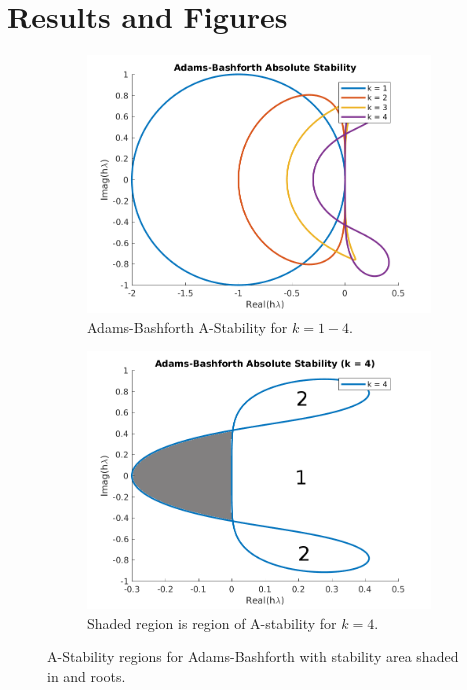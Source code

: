 \documentclass[12pt]{article}
\theoremstyle{remark}
\begin{document}
\newpage

\section{Results and Figures}

\begin{figure}[H]
	\centering
	\begin{subfigure}{.55\textwidth}
		\centering
		\includegraphics[width=1\linewidth]{5_2_2.png}
		\caption{Adams-Bashforth A-Stability for $k = 1-4.$}
		\label{fig:sub1}
	\end{subfigure}%
	\begin{subfigure}{.55\textwidth}
		\centering
		\includegraphics[width=1\linewidth]{5_2_2_single.png}
		\caption{Shaded region is region of A-stability for $k = 4.$}
		\label{fig:sub2}
	\end{subfigure}
	\caption{A-Stability regions for Adams-Bashforth  with stability area shaded in and roots.}
	\label{fig:test}
\end{figure}
\end{document}

